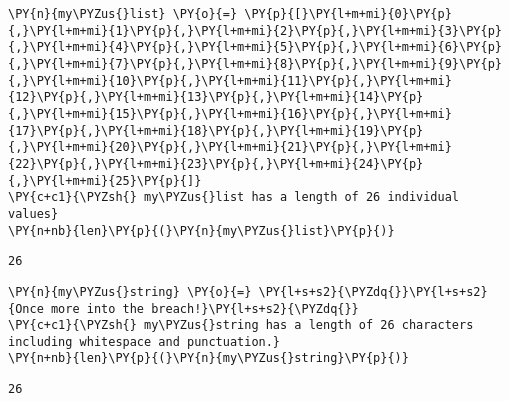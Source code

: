     \begin{tcolorbox}[breakable, size=fbox, boxrule=1pt, pad at break*=1mm,colback=cellbackground, colframe=cellborder]
\begin{Verbatim}[commandchars=\\\{\}]
\PY{n}{my\PYZus{}list} \PY{o}{=} \PY{p}{[}\PY{l+m+mi}{0}\PY{p}{,}\PY{l+m+mi}{1}\PY{p}{,}\PY{l+m+mi}{2}\PY{p}{,}\PY{l+m+mi}{3}\PY{p}{,}\PY{l+m+mi}{4}\PY{p}{,}\PY{l+m+mi}{5}\PY{p}{,}\PY{l+m+mi}{6}\PY{p}{,}\PY{l+m+mi}{7}\PY{p}{,}\PY{l+m+mi}{8}\PY{p}{,}\PY{l+m+mi}{9}\PY{p}{,}\PY{l+m+mi}{10}\PY{p}{,}\PY{l+m+mi}{11}\PY{p}{,}\PY{l+m+mi}{12}\PY{p}{,}\PY{l+m+mi}{13}\PY{p}{,}\PY{l+m+mi}{14}\PY{p}{,}\PY{l+m+mi}{15}\PY{p}{,}\PY{l+m+mi}{16}\PY{p}{,}\PY{l+m+mi}{17}\PY{p}{,}\PY{l+m+mi}{18}\PY{p}{,}\PY{l+m+mi}{19}\PY{p}{,}\PY{l+m+mi}{20}\PY{p}{,}\PY{l+m+mi}{21}\PY{p}{,}\PY{l+m+mi}{22}\PY{p}{,}\PY{l+m+mi}{23}\PY{p}{,}\PY{l+m+mi}{24}\PY{p}{,}\PY{l+m+mi}{25}\PY{p}{]}
\PY{c+c1}{\PYZsh{} my\PYZus{}list has a length of 26 individual values}
\PY{n+nb}{len}\PY{p}{(}\PY{n}{my\PYZus{}list}\PY{p}{)}
\end{Verbatim}
\end{tcolorbox}

            \begin{tcolorbox}[breakable, size=fbox, boxrule=.5pt, pad at break*=1mm, opacityfill=0]
\begin{Verbatim}[commandchars=\\\{\}]
26
\end{Verbatim}
\end{tcolorbox}
        
    \begin{tcolorbox}[breakable, size=fbox, boxrule=1pt, pad at break*=1mm,colback=cellbackground, colframe=cellborder]
\begin{Verbatim}[commandchars=\\\{\}]
\PY{n}{my\PYZus{}string} \PY{o}{=} \PY{l+s+s2}{\PYZdq{}}\PY{l+s+s2}{Once more into the breach!}\PY{l+s+s2}{\PYZdq{}}
\PY{c+c1}{\PYZsh{} my\PYZus{}string has a length of 26 characters including whitespace and punctuation.}
\PY{n+nb}{len}\PY{p}{(}\PY{n}{my\PYZus{}string}\PY{p}{)}
\end{Verbatim}
\end{tcolorbox}

            \begin{tcolorbox}[breakable, size=fbox, boxrule=.5pt, pad at break*=1mm, opacityfill=0]
\begin{Verbatim}[commandchars=\\\{\}]
26
\end{Verbatim}
\end{tcolorbox}
        
